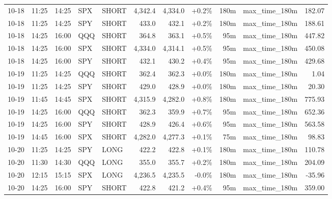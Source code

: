 \documentclass[11pt,a4paper,twoside]{article}
\begin{document}
\begin{center}
\begin{longtable}{>{\color{txtmain}}l l l l l r r r r >{\color{txtmain}}l r}
10-18 & 11:25 & 14:25 & SPX & SHORT & 4,342.4 & 4,334.0 & \textcolor{wingreen}{+0.2\%} & 180m & max\_time\_180m & \textcolor{wingreen}{182.07} \\
10-18 & 11:25 & 14:25 & SPY & SHORT & 433.0 & 432.1 & \textcolor{wingreen}{+0.2\%} & 180m & max\_time\_180m & \textcolor{wingreen}{188.61} \\
10-18 & 14:25 & 16:00 & QQQ & SHORT & 364.8 & 363.1 & \textcolor{wingreen}{+0.5\%} & 95m & max\_time\_180m & \textcolor{wingreen}{447.82} \\
10-18 & 14:25 & 16:00 & SPX & SHORT & 4,334.0 & 4,314.1 & \textcolor{wingreen}{+0.5\%} & 95m & max\_time\_180m & \textcolor{wingreen}{450.08} \\
10-18 & 14:25 & 16:00 & SPY & SHORT & 432.1 & 430.2 & \textcolor{wingreen}{+0.4\%} & 95m & max\_time\_180m & \textcolor{wingreen}{429.68} \\
10-19 & 11:25 & 14:25 & QQQ & SHORT & 362.4 & 362.3 & \textcolor{wingreen}{+0.0\%} & 180m & max\_time\_180m & \textcolor{wingreen}{1.04} \\
10-19 & 11:25 & 14:25 & SPY & SHORT & 429.0 & 428.9 & \textcolor{wingreen}{+0.0\%} & 180m & max\_time\_180m & \textcolor{wingreen}{20.30} \\
10-19 & 11:45 & 14:45 & SPX & SHORT & 4,315.9 & 4,282.0 & \textcolor{wingreen}{+0.8\%} & 180m & max\_time\_180m & \textcolor{wingreen}{775.93} \\
10-19 & 14:25 & 16:00 & QQQ & SHORT & 362.3 & 359.9 & \textcolor{wingreen}{+0.7\%} & 95m & max\_time\_180m & \textcolor{wingreen}{652.36} \\
10-19 & 14:25 & 16:00 & SPY & SHORT & 428.9 & 426.4 & \textcolor{wingreen}{+0.6\%} & 95m & max\_time\_180m & \textcolor{wingreen}{563.58} \\
10-19 & 14:45 & 16:00 & SPX & SHORT & 4,282.0 & 4,277.3 & \textcolor{wingreen}{+0.1\%} & 75m & max\_time\_180m & \textcolor{wingreen}{98.83} \\
10-20 & 11:25 & 14:25 & SPY & LONG & 422.2 & 422.8 & \textcolor{wingreen}{+0.1\%} & 180m & max\_time\_180m & \textcolor{wingreen}{110.78} \\
10-20 & 11:30 & 14:30 & QQQ & LONG & 355.0 & 355.7 & \textcolor{wingreen}{+0.2\%} & 180m & max\_time\_180m & \textcolor{wingreen}{204.09} \\
10-20 & 12:15 & 15:15 & SPX & LONG & 4,236.5 & 4,235.5 & \textcolor{lossred}{-0.0\%} & 180m & max\_time\_180m & \textcolor{lossred}{-35.96} \\
10-20 & 14:25 & 16:00 & SPY & SHORT & 422.8 & 421.2 & \textcolor{wingreen}{+0.4\%} & 95m & max\_time\_180m & \textcolor{wingreen}{359.00} \\

\end{longtable}
\end{center}
\end{document}
